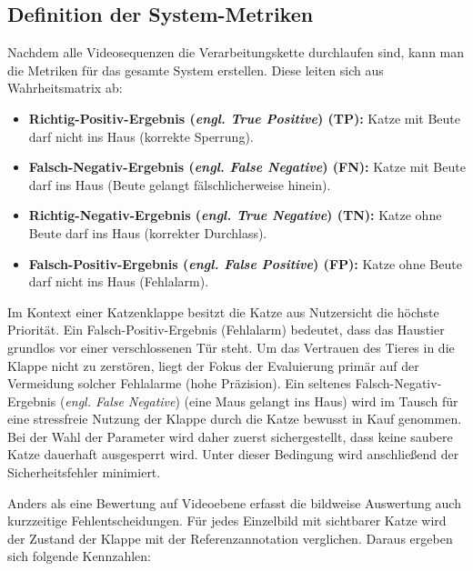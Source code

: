 \subsection{Definition der System-Metriken}
Nachdem alle Videosequenzen die Verarbeitungskette durchlaufen sind, kann man die Metriken für das gesamte System erstellen. Diese leiten sich aus Wahrheitsmatrix ab:

\begin{itemize}
    \item \textbf{Richtig-Positiv-Ergebnis (\emph{engl. True Positive}) (TP):} Katze mit Beute darf nicht ins Haus (korrekte Sperrung).
    \item \textbf{Falsch-Negativ-Ergebnis (\emph{engl. False Negative}) (FN):} Katze mit Beute darf ins Haus (Beute gelangt fälschlicherweise hinein).
    \item \textbf{Richtig-Negativ-Ergebnis (\emph{engl. True Negative}) (TN):} Katze ohne Beute darf ins Haus (korrekter Durchlass).
    \item \textbf{Falsch-Positiv-Ergebnis (\emph{engl. False Positive}) (FP):} Katze ohne Beute darf nicht ins Haus (Fehlalarm).
\end{itemize}

Im Kontext einer Katzenklappe besitzt die Katze aus Nutzersicht die höchste Priorität. Ein Falsch-Positiv-Ergebnis (Fehlalarm) bedeutet, dass das Haustier grundlos vor einer verschlossenen Tür steht. Um das Vertrauen des Tieres in die Klappe nicht zu zerstören, liegt der Fokus der Evaluierung primär auf der Vermeidung solcher Fehlalarme (hohe Präzision). Ein seltenes Falsch-Negativ-Ergebnis (\emph{engl. False Negative}) (eine Maus gelangt ins Haus) wird im Tausch für eine stressfreie Nutzung der Klappe durch die Katze bewusst in Kauf genommen. Bei der Wahl der Parameter wird daher zuerst sichergestellt, dass keine saubere Katze dauerhaft ausgesperrt wird. Unter dieser Bedingung wird anschließend der Sicherheitsfehler minimiert.


Anders als eine Bewertung auf Videoebene erfasst die bildweise Auswertung auch kurzzeitige Fehlentscheidungen. Für jedes Einzelbild mit sichtbarer Katze wird der Zustand der Klappe mit der Referenzannotation verglichen. Daraus ergeben sich folgende Kennzahlen:

